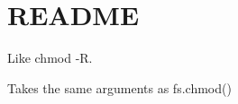\chapter{README}
\hypertarget{md__c_1_2_users_2_s_t_r_i_d_e_r_2source_2repos_2_ainslie_a_p_i_2wwwroot_2lib_2jquery-ui_2node__m07d720121ce0157d7866f5c00bd133ca}{}\label{md__c_1_2_users_2_s_t_r_i_d_e_r_2source_2repos_2_ainslie_a_p_i_2wwwroot_2lib_2jquery-ui_2node__m07d720121ce0157d7866f5c00bd133ca}
Like {\ttfamily chmod -\/R}.

Takes the same arguments as {\ttfamily fs.\+chmod()} 